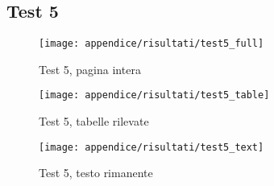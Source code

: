 \newpage
\subsection{Test 5}
\begin{figure}[H] 
    \centering
    \texttt{[image: appendice/risultati/test5\_full]} 
    \caption{Test 5, pagina intera}
    \label{img:test-0-full}
\end{figure} 
\newpage
\begin{figure}[H]  
        \centering  
        \texttt{[image: appendice/risultati/test5\_table]}  
        \caption{Test 5, tabelle rilevate}
\end{figure}
\begin{figure}[H]
        \centering  
        \texttt{[image: appendice/risultati/test5\_text]}  
        \caption{Test 5, testo rimanente}
\end{figure}%
